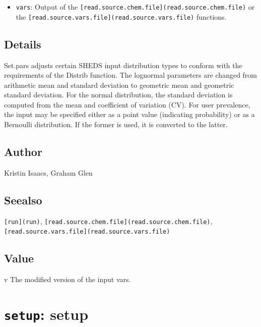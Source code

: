 \documentclass[
]{article}
\providecommand{\tightlist}{%
  \setlength{\itemsep}{0pt}\setlength{\parskip}{0pt}}
\begin{document}
\begin{itemize}
\tightlist
\item
  \texttt{vars}: Output of the
  \texttt{{[}read.source.chem.file{]}(read.source.chem.file)} or the
  \texttt{{[}read.source.vars.file{]}(read.source.vars.file)} functions.
\end{itemize}

\hypertarget{details-28}{%
\subsection{Details}\label{details-28}}

Set.pars adjusts certain SHEDS input distribution types to conform with
the requirements of the Distrib function. The lognormal parameters are
changed from arithmetic mean and standard deviation to geometric mean
and geometric standard deviation. For the normal distribution, the
standard deviation is computed from the mean and coefficient of
variation (CV). For user prevalence, the input may be specified either
as a point value (indicating probability) or as a Bernoulli
distribution. If the former is used, it is converted to the latter.

\hypertarget{author-30}{%
\subsection{Author}\label{author-30}}

Kristin Isaacs, Graham Glen

\hypertarget{seealso-23}{%
\subsection{Seealso}\label{seealso-23}}

\texttt{{[}run{]}(run)},
\texttt{{[}read.source.chem.file{]}(read.source.chem.file)},
\texttt{{[}read.source.vars.file{]}(read.source.vars.file)}

\hypertarget{value-33}{%
\subsection{Value}\label{value-33}}

v The modified version of the input vars.

\hypertarget{setup-setup}{%
\section{\texorpdfstring{\texttt{setup}:
setup}{setup: setup}}\label{setup-setup}}
\end{document}
